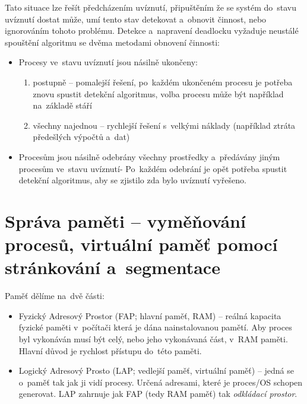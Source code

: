 Tato situace lze řešít předcházením uvíznutí, připuštěním že se systém do~stavu uvíznutí dostat může, umí tento stav detekovat a~obnovit činnost, nebo ignorováním tohoto problému. Detekce a~napravení deadlocku vyžaduje neustálé spouštění algoritmu se dvěma metodami obnovení činnosti:

\begin{itemize}[noitemsep]
	\item Procesy ve~stavu uvíznutí jsou násilně ukončeny:
	\begin{enumerate}[noitemsep]
		\item postupně -- pomalejší řešení, po~každém ukončeném procesu je potřeba znovu spustit detekční algoritmus, volba procesu může být například na~základě stáří
		\item všechny najednou -- rychlejší řešení s~velkými náklady (například ztráta předešlých výpočtů a~dat)
	\end{enumerate}
	
	\item Procesům jsou násilně odebrány všechny prostředky a~předávány jiným procesům ve~stavu uvíznutí- Po~každém odebrání je opět potřeba spustit detekční algoritmus, aby se zjistilo zda bylo uvíznutí vyřešeno.
\end{itemize}


\clearpage
\section{Správa paměti -- vyměňování procesů, virtuální paměť pomocí stránkování a~segmentace}

Paměť dělíme na~dvě části:
\begin{itemize}[noitemsep]
	\item Fyzický Adresový Prostor (FAP; hlavní paměť, RAM) -- reálná kapacita fyzické paměti v~počítači která je dána nainstalovanou pamětí. Aby proces byl vykonáván musí být celý, nebo jeho vykonávaná část, v~RAM paměti. Hlavní důvod je rychlost přístupu do~této paměti.
	\item Logický Adresový Prosto (LAP; vedlejší paměť, virtuální paměť) -- jedná se o~paměť tak jak ji vidí procesy. Určená adresami, které je proces/OS schopen generovat. LAP zahrnuje jak FAP (tedy RAM paměť) tak \emph{odkládací prostor}.
\end{itemize}

